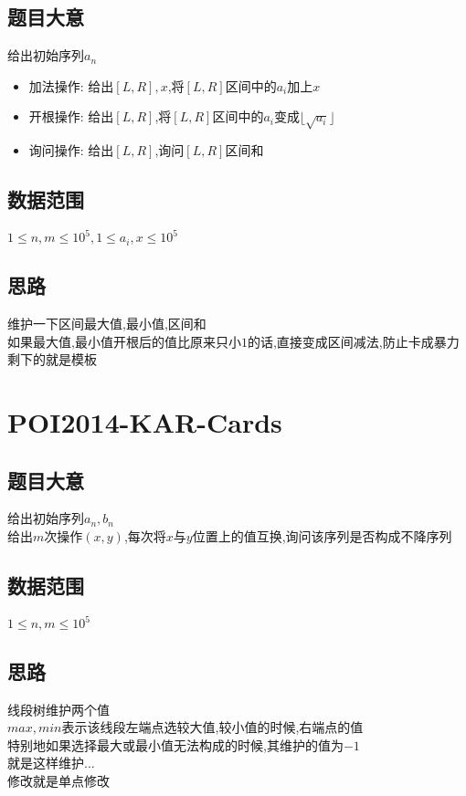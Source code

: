 \documentclass{ctexart}
\numberwithin{equation}{section}
\begin{document}
\begin{flushleft}
  \subsection{题目大意}
  给出初始序列${a_n}$ \\
  \begin{itemize}
  \item 加法操作: 给出$[L,R],x$,将$[L,R]$区间中的$a_i$加上$x$ \\
  \item 开根操作: 给出$[L,R]$,将$[L,R]$区间中的$a_i$变成$\lfloor{\sqrt{a_i}}\rfloor $ \\
  \item 询问操作: 给出$[L,R]$,询问$[L,R]$区间和 \\
  \end{itemize}

  \subsection{数据范围}
  $1\le n,m\le 10^5,1\le a_i,x\le 10^5 $ \\
  \subsection{思路}
  维护一下区间最大值,最小值,区间和 \\
  如果最大值,最小值开根后的值比原来只小$1$的话,直接变成区间减法,防止卡成暴力 \\
  剩下的就是模板 \\
  \newpage

  \section{POI2014-KAR-Cards}
  \subsection{题目大意}
  给出初始序列${a_n},{b_n}$ \\
  给出$m$次操作$(x,y)$,每次将$x$与$y$位置上的值互换,询问该序列是否构成不降序列 \\

  \subsection{数据范围}
  $1\le n,m\le 10^5$ \\
  \subsection{思路}
  线段树维护两个值 \\
  $max,min$表示该线段左端点选较大值,较小值的时候,右端点的值\\
  特别地如果选择最大或最小值无法构成的时候,其维护的值为$-1$ \\
  就是这样维护...\\
  修改就是单点修改 \\
  \newpage


\end{flushleft}
\end{document}

